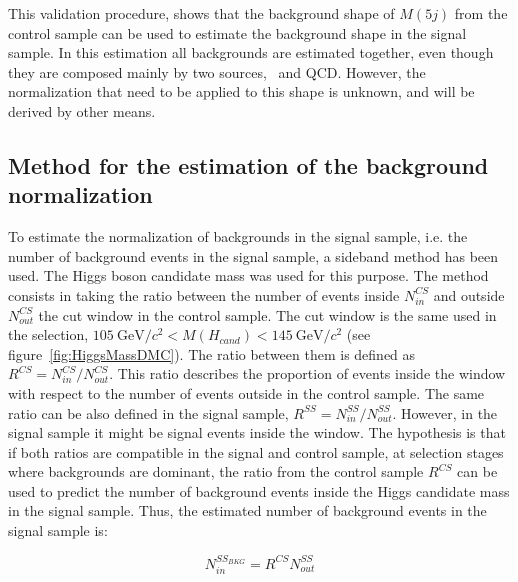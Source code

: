This validation procedure, shows that the background shape of $M(5j)$ from the control sample can be used to estimate the background shape in the signal sample. In this estimation all backgrounds are estimated together, even though they are composed mainly by two sources, \ttbar~and QCD. However, the normalization that need to be applied to this shape is unknown, and will be derived by other means. 

\subsection{Method for the estimation of the background normalization}
\label{sec:bkgnormmet}

To estimate the normalization of backgrounds in the signal sample, i.e. the number of background events in the signal sample, a sideband method has been used. The Higgs boson candidate mass was used for this purpose. The method consists in taking the ratio between the number of events inside $N^{CS}_{in}$ and outside $N^{CS}_{out}$ the cut window in the control sample. The cut window is the same used in the selection, $105~\text{GeV}/c^{2} <M(H_{cand})<145~\text{GeV}/c^{2}$ (see figure~\ref{fig:HiggsMassDMC}). The ratio between them is defined as $R^{CS}=N^{CS}_{in}/N^{CS}_{out}$. This ratio describes the proportion of events inside the window with respect to the number of events outside in the control sample. The same ratio can be also defined in the signal sample, $R^{SS}=N^{SS}_{in}/N^{SS}_{out}$. However, in the signal sample it might be signal events inside the window. The hypothesis is that if both ratios are compatible in the signal and control sample, at selection stages where backgrounds are dominant, the ratio from the control sample $R^{CS}$ can be used to predict the number of background events inside the Higgs candidate mass in the signal sample. Thus, the estimated number of background events in the signal sample is:

\begin{equation}
  \label{eq:NormMethod}
  N^{SS_{BKG}}_{in}=R^{CS}N^{SS}_{out}
\end{equation}

